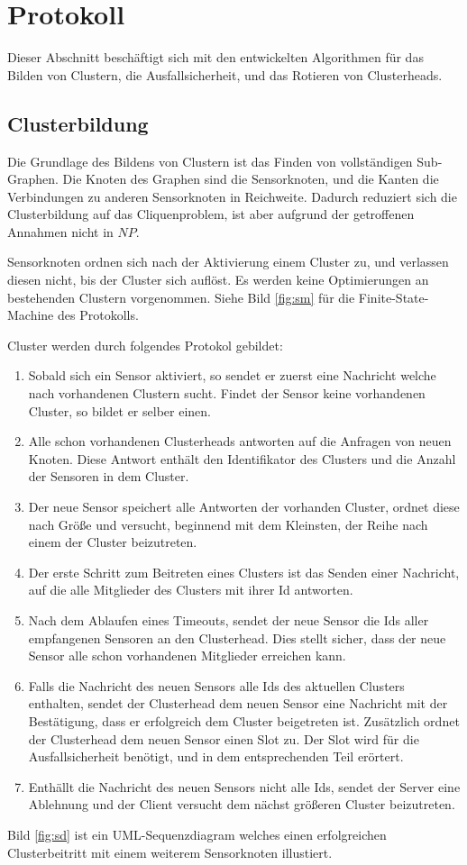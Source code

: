 \section{Protokoll} \label{sec:algo}
Dieser Abschnitt besch\"aftigt sich mit den entwickelten Algorithmen f\"ur das Bilden von Clustern, die Ausfallsicherheit, und das Rotieren von Clusterheads.

\subsection{Clusterbildung}
Die Grundlage des Bildens von Clustern ist das Finden von vollst\"andigen Sub-Graphen.
Die Knoten des Graphen sind die Sensorknoten, und die Kanten die Verbindungen zu anderen Sensorknoten in Reichweite.
Dadurch reduziert sich die Clusterbildung auf das Cliquenproblem, ist aber aufgrund der getroffenen Annahmen nicht in $NP$.

Sensorknoten ordnen sich nach der Aktivierung einem Cluster zu, und verlassen diesen nicht, bis der Cluster sich aufl\"ost. Es werden keine Optimierungen an bestehenden Clustern vorgenommen.
Siehe Bild \ref{fig:sm} f\"ur die Finite-State-Machine des Protokolls.

Cluster werden durch folgendes Protokol gebildet:
\begin{enumerate}
\item Sobald sich ein Sensor aktiviert, so sendet er zuerst eine Nachricht welche nach vorhandenen Clustern sucht. Findet der Sensor keine vorhandenen Cluster, so bildet er selber einen.
\item Alle schon vorhandenen Clusterheads antworten auf die Anfragen von neuen Knoten. Diese Antwort enthält den Identifikator des Clusters und die Anzahl der Sensoren in dem Cluster.
\item Der neue Sensor speichert alle Antworten der vorhanden Cluster, ordnet diese nach Gr\"o\ss e und versucht, beginnend mit dem Kleinsten, der Reihe nach einem der Cluster beizutreten.
\item Der erste Schritt zum Beitreten eines Clusters ist das Senden einer Nachricht, auf die alle Mitglieder des Clusters mit ihrer Id antworten.
\item Nach dem Ablaufen eines Timeouts, sendet der neue Sensor die Ids aller empfangenen Sensoren an den Clusterhead. Dies stellt sicher, dass der neue Sensor alle schon vorhandenen Mitglieder erreichen kann.
\item Falls die Nachricht des neuen Sensors alle Ids des aktuellen Clusters enthalten, sendet der Clusterhead dem neuen Sensor eine Nachricht mit der Best\"atigung, dass er erfolgreich dem Cluster beigetreten ist. Zus\"atzlich ordnet der Clusterhead dem neuen Sensor einen Slot zu. Der Slot wird für die Ausfallsicherheit benötigt, und in dem entsprechenden Teil erörtert.
\item Enthällt die Nachricht des neuen Sensors nicht alle Ids, sendet der Server eine Ablehnung und der Client versucht dem n\"achst gr\"o\ss eren Cluster beizutreten.
\end{enumerate}
Bild \ref{fig:sd} ist ein UML-Sequenzdiagram welches einen erfolgreichen Clusterbeitritt mit einem weiterem Sensorknoten illustiert.



